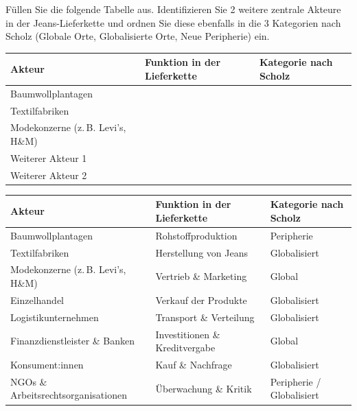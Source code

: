 \begin{myexercise}
Füllen Sie die folgende Tabelle aus. Identifizieren Sie 2 weitere zentrale Akteure in der Jeans-Lieferkette und ordnen Sie diese ebenfalls in die 3 Kategorien nach Scholz (Globale Orte, Globalisierte Orte, Neue Peripherie) ein.

\begin{table}[H]
\centering
\small
\begin{tabular}{p{4cm}||p{6cm}|p{4cm}}
\textbf{Akteur} & \textbf{Funktion in der Lieferkette} & \textbf{Kategorie nach Scholz }\\
\midrule\midrule
Baumwollplantagen & & \\[1cm]\midrule
Textilfabriken & & \\[1cm]\midrule
Modekonzerne (z. B. Levi’s, H\&M) & & \\[1cm]\midrule
Weiterer Akteur 1 & & \\[1cm]\midrule
Weiterer Akteur 2 & & \\[1cm]
\end{tabular}
\end{table}
\begin{myanswer}
\begin{table}[H]
\small
\centering
\begin{tabular}{p{4cm}||p{5cm}|p{3cm}}
\textbf{Akteur} & \textbf{Funktion in der Lieferkette} & \textbf{Kategorie nach Scholz }\\
\midrule\midrule
Baumwollplantagen & Rohstoffproduktion & Peripherie \\\midrule
Textilfabriken & Herstellung von Jeans & Globalisiert \\\midrule
Modekonzerne (z. B. Levi’s, H\&M) & Vertrieb \& Marketing & Global \\\midrule
Einzelhandel & Verkauf der Produkte & Globalisiert \\\midrule
Logistikunternehmen & Transport \& Verteilung & Globalisiert \\\midrule
Finanzdienstleister \& Banken & Investitionen \& Kreditvergabe & Global \\\midrule
Konsument:innen & Kauf \& Nachfrage & Globalisiert \\\midrule
NGOs \& Arbeitsrechtsorganisationen & Überwachung \& Kritik & Peripherie / Globalisiert
\end{tabular}
\end{table}
\end{myanswer}
\end{myexercise}

